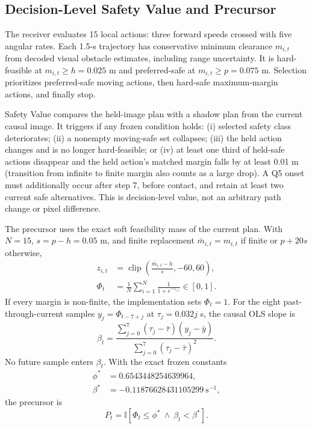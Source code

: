 \documentclass[letterpaper,10pt,conference]{ieeeconf}
\begin{document}
\subsection{Decision-Level Safety Value and Precursor}
The receiver evaluates 15 local actions: three forward speeds crossed with
five angular rates. Each 1.5-s trajectory has conservative minimum clearance
$m_{i,t}$ from decoded visual obstacle estimates, including range uncertainty.
It is hard-feasible at $m_{i,t}\geq h=0.025$ m and preferred-safe at
$m_{i,t}\geq p=0.075$ m. Selection prioritizes preferred-safe moving actions,
then hard-safe maximum-margin actions, and finally stop.

Safety Value compares the held-image plan with a shadow plan from the current
causal image. It triggers if any frozen condition holds: (i) selected safety
class deteriorates; (ii) a nonempty moving-safe set collapses; (iii) the held
action changes and is no longer hard-feasible; or (iv) at least one third of
held-safe actions disappear and the held action's matched margin falls by at
least 0.01 m (transition from infinite to finite margin also counts as a large
drop). A Q5 onset must additionally occur after step 7, before contact, and
retain at least two current safe alternatives. This is decision-level value,
not an arbitrary path change or pixel difference.

The precursor uses the exact soft feasibility mass of the current plan. With
$N=15$, $s=p-h=0.05$ m, and finite replacement
$\bar m_{i,t}=m_{i,t}$ if finite or $p+20s$ otherwise,
\begin{align}
z_{i,t}&=\operatorname{clip}\!\left(
\frac{\bar m_{i,t}-h}{s},-60,60\right),\\
\Phi_t&=\frac{1}{N}\sum_{i=1}^{N}\frac{1}{1+e^{-z_{i,t}}}\in[0,1].
\label{eq:softmass}
\end{align}
If every margin is non-finite, the implementation sets $\Phi_t=1$.
For the eight past-through-current samples $y_j=\Phi_{t-7+j}$ at
$\tau_j=0.032j$ s, the causal OLS slope is
\begin{equation}
\beta_t=\frac{\sum_{j=0}^{7}(\tau_j-\bar\tau)(y_j-\bar y)}
{\sum_{j=0}^{7}(\tau_j-\bar\tau)^2}.
\end{equation}
No future sample enters $\beta_t$. With the exact frozen constants
\begin{align}
\phi^*&=0.6543448254639964,\nonumber\\
\beta^*&=-0.11876628431105299~\mathrm{s}^{-1},\nonumber
\end{align}
the precursor is
\begin{equation}
P_t=\mathbb I[\Phi_t\leq\phi^*\ \land\ \beta_t<\beta^*].
\label{eq:precursor}
\end{equation}
\end{document}
